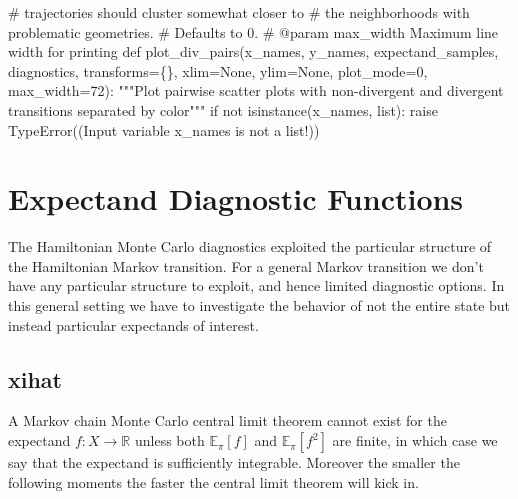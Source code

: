 \documentclass[
  letterpaper,
  DIV=11,
  numbers=noendperiod]{scrartcl}
\newenvironment{Shaded}{\begin{snugshade}}{\end{snugshade}}
\newcommand{\BuiltInTok}[1]{\textcolor[rgb]{0.00,0.23,0.31}{#1}}
\newcommand{\CommentTok}[1]{\textcolor[rgb]{0.37,0.37,0.37}{#1}}
\newcommand{\ControlFlowTok}[1]{\textcolor[rgb]{0.00,0.23,0.31}{#1}}
\newcommand{\DecValTok}[1]{\textcolor[rgb]{0.68,0.00,0.00}{#1}}
\newcommand{\KeywordTok}[1]{\textcolor[rgb]{0.00,0.23,0.31}{#1}}
\newcommand{\NormalTok}[1]{\textcolor[rgb]{0.00,0.23,0.31}{#1}}
\newcommand{\OperatorTok}[1]{\textcolor[rgb]{0.37,0.37,0.37}{#1}}
\newcommand{\PreprocessorTok}[1]{\textcolor[rgb]{0.68,0.00,0.00}{#1}}
\newcommand{\StringTok}[1]{\textcolor[rgb]{0.13,0.47,0.30}{#1}}
\newcommand{\VariableTok}[1]{\textcolor[rgb]{0.07,0.07,0.07}{#1}}
\begin{document}
\begin{Shaded}
\begin{Highlighting}[]
\CommentTok{\#                        trajectories should cluster somewhat closer to}
\CommentTok{\#                        the neighborhoods with problematic geometries.}
\CommentTok{\#                   Defaults to 0.}
\CommentTok{\# @param max\_width Maximum line width for printing}
\KeywordTok{def}\NormalTok{ plot\_div\_pairs(x\_names, y\_names, expectand\_samples, }
\NormalTok{                   diagnostics, transforms}\OperatorTok{=}\NormalTok{\{\},}
\NormalTok{                   xlim}\OperatorTok{=}\VariableTok{None}\NormalTok{, ylim}\OperatorTok{=}\VariableTok{None}\NormalTok{, }
\NormalTok{                   plot\_mode}\OperatorTok{=}\DecValTok{0}\NormalTok{, max\_width}\OperatorTok{=}\DecValTok{72}\NormalTok{):}
  \CommentTok{"""Plot pairwise scatter plots with non{-}divergent and divergent }
\CommentTok{     transitions separated by color"""}
  \ControlFlowTok{if} \KeywordTok{not} \BuiltInTok{isinstance}\NormalTok{(x\_names, }\BuiltInTok{list}\NormalTok{):}
    \ControlFlowTok{raise} \PreprocessorTok{TypeError}\NormalTok{((}\StringTok{\textquotesingle{}Input variable \textasciigrave{}x\_names\textasciigrave{} is not a list!\textquotesingle{}}\NormalTok{))}
\end{Highlighting}
\end{Shaded}

\section{Expectand Diagnostic
Functions}\label{expectand-diagnostic-functions}

The Hamiltonian Monte Carlo diagnostics exploited the particular
structure of the Hamiltonian Markov transition. For a general Markov
transition we don't have any particular structure to exploit, and hence
limited diagnostic options. In this general setting we have to
investigate the behavior of not the entire state but instead particular
expectands of interest.

\subsection{xihat}\label{xihat}

A Markov chain Monte Carlo central limit theorem cannot exist for the
expectand \(f : X \rightarrow \mathbb{R}\) unless both
\(\mathbb{E}_{\pi}[f]\) and \(\mathbb{E}_{\pi}[f^{2}]\) are finite, in
which case we say that the expectand is sufficiently integrable.
Moreover the smaller the following moments the faster the central limit
theorem will kick in.
\end{document}
